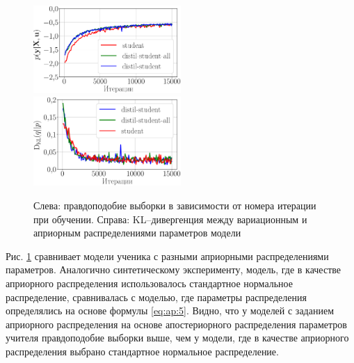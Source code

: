 \begin{figure}[h!]
\includegraphics[width=0.5\textwidth]{results/bayesdistil/fashionmnist_likelihood_2_layers.eps}
\includegraphics[width=0.5\textwidth]{results/bayesdistil/fashionmnist_D_KL_2_layers.eps}
\caption{Слева: правдоподобие выборки в зависимости от номера итерации при обучении. Справа: KL--дивергенция между вариационным и априорным распределениями параметров модели}
\label{exp:fig3}
\end{figure}

Рис. \ref{exp:fig3} сравнивает модели ученика с разными априорными распределениями параметров.
Аналогично синтетическому эксперименту, модель, где в качестве априорного распределения использовалось стандартное нормальное распределение, сравнивалась с моделью, где параметры распределения определялись на основе формулы \eqref{eq:ap:5}. Видно, что у моделей с заданием априорного распределения на основе апостериорного распределения параметров учителя правдоподобие выборки выше, чем у модели, где в качестве априорного распределения выбрано стандартное нормальное распределение.

